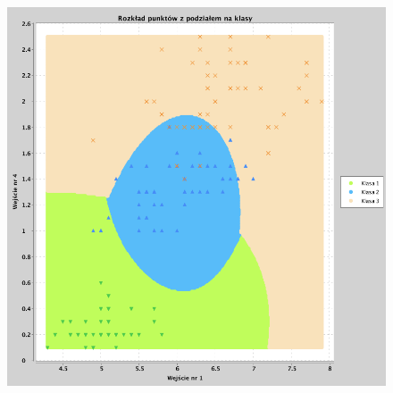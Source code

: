 \documentclass[a4paper, portrait,11pt]{article}
\begin{document}
\begin{figure}[!htb]
\begin{minipage}{0.33\textwidth}
    \caption{\label{fig:43_2_1,3}}
  \end{minipage}
  \begin{minipage}{0.33\textwidth}
    \centering
    \includegraphics[width=1\linewidth]{../data/classification4/3/2_1,4.png}
    \caption{\label{fig:43_2_1,4}}
  \end{minipage}\hfill
\end{figure}
\end{document}
